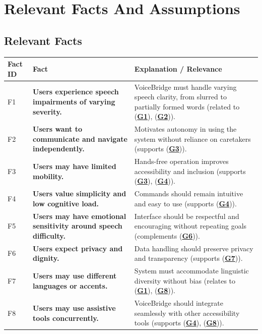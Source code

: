 \documentclass[12pt]{article}
\begin{document}
\section{Relevant Facts And Assumptions}
\subsection{Relevant Facts}

\begin{table}[H]
\centering
\begin{tabularx}{\textwidth}{p{1cm}p{6cm}X}
\toprule {\textbf{Fact ID}} & {\textbf{Fact}} & {\textbf{Explanation / Relevance}}\\
\midrule
F1 & \textbf{Users experience speech impairments of varying severity.} & VoiceBridge must handle varying speech clarity, from slurred to partially formed words (related to (\textbf{\hyperref[tab:project-goals]{G1}}), (\textbf{\hyperref[tab:project-goals]{G2}})). \\ \hline
F2 & \textbf{Users want to communicate and navigate independently.} & Motivates autonomy in using the system without reliance on caretakers (supports (\textbf{\hyperref[tab:project-goals]{G3}})). \\ \hline
F3 & \textbf{Users may have limited mobility.} & Hands-free operation improves accessibility and inclusion (supports (\textbf{\hyperref[tab:project-goals]{G3}}), (\textbf{\hyperref[tab:project-goals]{G4}})). \\ \hline
F4 & \textbf{Users value simplicity and low cognitive load.} & Commands should remain intuitive and easy to use (supports (\textbf{\hyperref[tab:project-goals]{G4}})). \\ \hline
F5 & \textbf{Users may have emotional sensitivity around speech difficulty.} & Interface should be respectful and encouraging without repeating goals (complements (\textbf{\hyperref[tab:project-goals]{G6}})). \\ \hline
F6 & \textbf{Users expect privacy and dignity.} & Data handling should preserve privacy and transparency (supports (\textbf{\hyperref[tab:project-goals]{G7}})). \\ \hline
F7 & \textbf{Users may use different languages or accents.} & System must accommodate linguistic diversity without bias (relates to (\textbf{\hyperref[tab:project-goals]{G1}}), (\textbf{\hyperref[tab:project-goals]{G8}})). \\ \hline
F8 & \textbf{Users may use assistive tools concurrently.} & VoiceBridge should integrate seamlessly with other accessibility tools (supports (\textbf{\hyperref[tab:project-goals]{G4}}), (\textbf{\hyperref[tab:project-goals]{G8}})). \\ \hline

\end{tabularx}
\end{table}
\end{document}

